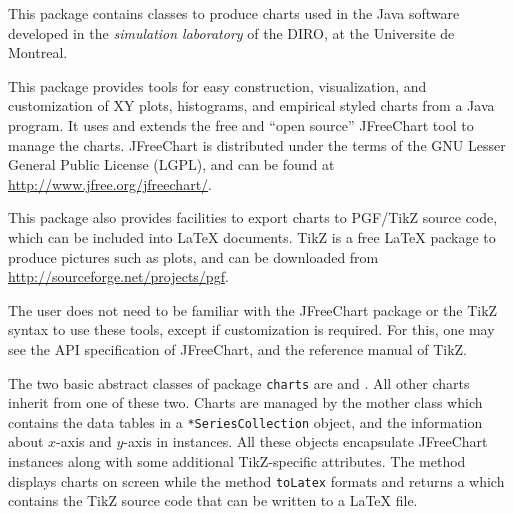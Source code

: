 \latex{\label {sec:overview}}

\begin {htmlonly}
This package contains classes to produce charts used in the Java software developed in the {\em simulation laboratory\/}
of the DIRO, at the Universite de Montreal.
\end {htmlonly}

This package provides tools for easy
construction, visualization, and customization
of XY plots, histograms, and empirical styled charts
from a Java program.
It uses and extends the free and ``open source''
JFreeChart tool to manage the
charts. JFreeChart is
distributed under the terms of the GNU Lesser General Public License
(LGPL), and can be found at \url{http://www.jfree.org/jfreechart/}.

This package also provides facilities
to export charts to PGF/TikZ source code, which can be included into
\LaTeX{} documents. TikZ is a free \LaTeX{}
package to produce pictures such as plots, and can be downloaded from
\url{http://sourceforge.net/projects/pgf}.

The user does not need to be familiar with the JFreeChart package
or the TikZ syntax to
use these tools, except if customization is required.
For this, one may see the API specification of JFreeChart, and
the reference manual of TikZ.

The two basic abstract classes of package \texttt{charts} are
 and
. All other
charts inherit from one of these two. Charts are managed by
the mother class which contains the data tables in a
\texttt{*SeriesCollection} object, and the
information about $x$-axis and $y$-axis in
 instances.
All these objects encapsulate JFreeChart instances along with some
additional TikZ-specific attributes.
The method
displays charts on screen while the method
\texttt{toLatex} formats and returns a
 which contains the TikZ source
code that can be written to a \LaTeX{} file.

